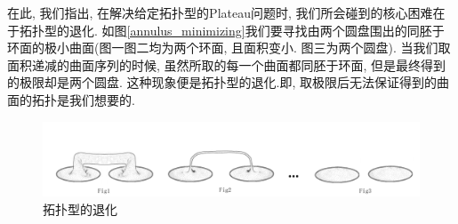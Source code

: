 在此, 我们指出, 在解决给定拓扑型的Plateau问题时, 我们所会碰到的核心困难在于拓扑型的退化. 如图\eqref{annulus_minimizing}我们要寻找由两个圆盘围出的同胚于环面的极小曲面(图一图二均为两个环面, 且面积变小. 图三为两个圆盘). 当我们取面积递减的曲面序列的时候, 虽然所取的每一个曲面都同胚于环面, 但是最终得到的极限却是两个圆盘. 这种现象便是拓扑型的退化.即, 取极限后无法保证得到的曲面的拓扑是我们想要的.
\begin{figure}[ht]
    \centering
    \includegraphics[scale=0.8]{images/annulus_minimizing.png}
    \caption{拓扑型的退化}
    \label{annulus_minimizing}
\end{figure}

